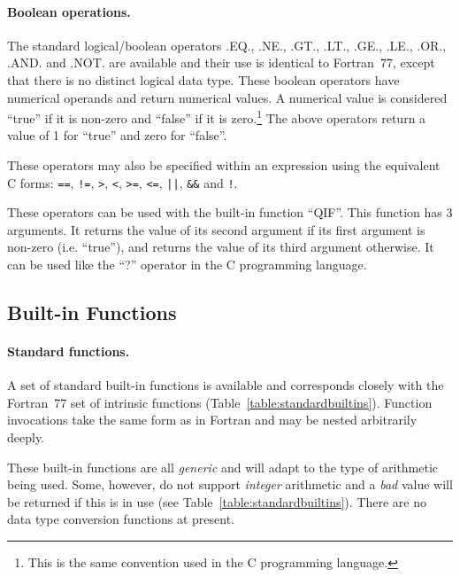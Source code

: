 \documentclass[twoside,11pt]{article}
\newcommand{\xlabel}[1]{}
\renewcommand{\_}{\texttt{\symbol{95}}}
\begin{document}
\paragraph{Boolean operations.}
The standard logical/boolean operators .EQ., .NE., .GT., .LT.,
.GE., .LE., .OR., .AND. and .NOT. are available and their use
is identical to Fortran~77, except that there is no distinct logical data
type. These boolean operators have numerical operands and return numerical
values. A numerical value is considered ``true'' if it is non-zero and
``false'' if it is zero.\footnote{This is the same convention used in
the C programming language.} The above operators return a value of 1 for
``true'' and zero for ``false''.

These operators may also be specified within an expression using the
equivalent C forms:
\verb#==#,
\verb#!=#,
\verb#>#,
\verb#<#,
\verb#>=#,
\verb#<=#,
\verb#||#,
\verb#&&# and
\verb#!#.

These operators can be used with the built-in function ``QIF''. This
function has 3 arguments. It returns the value of its second argument if its
first argument is non-zero (i.e. ``true''), and returns the value of its
third argument otherwise. It can be used like the ``?'' operator in the C
programming language.

\subsection{\xlabel{builtin_functions}Built-in Functions}

\paragraph{Standard functions.}
A set of standard built-in functions is available and corresponds closely
with the Fortran~77 set of intrinsic functions
(Table~\ref{table:standardbuiltins}).
Function invocations take the same form as in Fortran and may be nested
arbitrarily deeply.

These built-in functions are all \emph{generic} and will adapt to the type of
arithmetic being used.
Some, however, do not support \emph{integer} arithmetic and a \emph{bad} value
will be returned if this is in use (see Table~\ref{table:standardbuiltins}).
There are no data type conversion functions at present.
\end{document}
